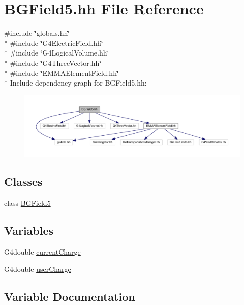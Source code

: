 \hypertarget{BGField5_8hh}{}\section{B\+G\+Field5.\+hh File Reference}
\label{BGField5_8hh}
{\ttfamily \#include \char`\"{}globals.\+hh\char`\"{}}\\*
{\ttfamily \#include \char`\"{}G4\+Electric\+Field.\+hh\char`\"{}}\\*
{\ttfamily \#include \char`\"{}G4\+Logical\+Volume.\+hh\char`\"{}}\\*
{\ttfamily \#include \char`\"{}G4\+Three\+Vector.\+hh\char`\"{}}\\*
{\ttfamily \#include \char`\"{}E\+M\+M\+A\+Element\+Field.\+hh\char`\"{}}\\*
Include dependency graph for B\+G\+Field5.\+hh\+:
\nopagebreak
\begin{figure}[H]
\begin{center}
\leavevmode
\includegraphics[width=350pt]{BGField5_8hh__incl}
\end{center}
\end{figure}
\subsection*{Classes}
\begin{DoxyCompactItemize}
\item 
class \hyperlink{classBGField5}{B\+G\+Field5}
\end{DoxyCompactItemize}
\subsection*{Variables}
\begin{DoxyCompactItemize}
\item 
G4double \hyperlink{BGField5_8hh_acb265d8eecfa1acd31056f0c7915362e}{current\+Charge}
\item 
G4double \hyperlink{BGField5_8hh_a2d61cdd1b1b5ed409f7c91b54737c1b9}{user\+Charge}
\end{DoxyCompactItemize}


\subsection{Variable Documentation}
